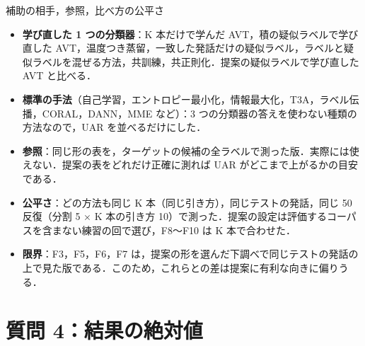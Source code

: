 \begin{frame}{補助の相手，参照，比べ方の公平さ}
\footnotesize
\begin{itemize}\setlength\itemsep{4pt}
\item \textbf{学び直した 1 つの分類器}：K 本だけで学んだ AVT，積の疑似ラベルで学び直した AVT，温度つき蒸留，一致した発話だけの疑似ラベル，ラベルと疑似ラベルを混ぜる方法，共訓練，共正則化．提案の疑似ラベルで学び直した AVT と比べる．
\item \textbf{標準の手法}（自己学習，エントロピー最小化，情報最大化，T3A，ラベル伝播，CORAL，DANN，MME など）：3 つの分類器の答えを使わない種類の方法なので，UAR を並べるだけにした．
\item \textbf{参照}：同じ形の表を，ターゲットの候補の全ラベルで測った版．実際には使えない．提案の表をどれだけ正確に測れば UAR がどこまで上がるかの目安である．
\item \textbf{公平さ}：どの方法も同じ K 本（同じ引き方），同じテストの発話，同じ 50 反復（分割 5 × K 本の引き方 10）で測った．提案の設定は評価するコーパスを含まない練習の回で選び，F8〜F10 は K 本で合わせた．
\item \textbf{限界}：F3，F5，F6，F7 は，提案の形を選んだ下調べで同じテストの発話の上で見た版である．このため，これらとの差は提案に有利な向きに偏りうる．
\end{itemize}
\end{frame}

\section{質問 4：結果の絶対値}

